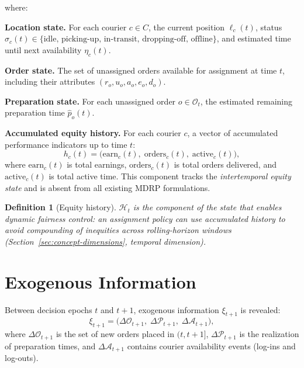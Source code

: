 \documentclass[12pt,a4paper]{report}
\newtheorem{definition}{Definition}
\begin{document}
\noindent where:
\begin{description}[leftmargin=2.5cm,style=nextline]
    \item[$\mathcal{L}_t$] \textbf{Location state.} For each courier $c \in C$, the current position $\ell_c(t)$, status $\sigma_c(t) \in \{\text{idle, picking-up, in-transit, dropping-off, offline}\}$, and estimated time until next availability $\eta_c(t)$.

    \item[$\mathcal{O}_t$] \textbf{Order state.} The set of unassigned orders available for assignment at time $t$, including their attributes $(r_o, u_o, a_o, e_o, d_o)$.

    \item[$\mathcal{P}_t$] \textbf{Preparation state.} For each unassigned order $o \in \mathcal{O}_t$, the estimated remaining preparation time $\hat{p}_o(t)$.

    \item[$\mathcal{H}_t$] \textbf{Accumulated equity history.} For each courier $c$, a vector of accumulated performance indicators up to time $t$:
        \begin{equation}
            h_c(t) = \bigl(\text{earn}_c(t),\; \text{orders}_c(t),\;
            \text{active}_c(t)\bigr),
        \end{equation}
        where $\text{earn}_c(t)$ is total earnings, $\text{orders}_c(t)$ is total orders delivered, and $\text{active}_c(t)$ is total active time. This component tracks the \emph{intertemporal equity state} and is absent from all existing MDRP formulations.
\end{description}

\begin{definition}[Equity history]
    $\mathcal{H}_t$ is the component of the state that enables \emph{dynamic fairness control}: an assignment policy can use accumulated history to avoid compounding of inequities across rolling-horizon windows (Section~\ref{sec:concept-dimensions}, temporal dimension).
\end{definition}

\section{Exogenous Information}
\label{sec:exogenous}

Between decision epochs $t$ and $t+1$, exogenous information $\xi_{t+1}$ is revealed:
\begin{equation}
    \xi_{t+1} = \bigl(\Delta\mathcal{O}_{t+1},\; \Delta\mathcal{P}_{t+1},\;
    \Delta\mathcal{A}_{t+1}\bigr),
\end{equation}
where $\Delta\mathcal{O}_{t+1}$ is the set of new orders placed in $(t, t+1]$,
$\Delta\mathcal{P}_{t+1}$ is the realization of preparation times, and $\Delta\mathcal{A}_{t+1}$ contains courier availability events (log-ins and log-outs).
\end{document}
